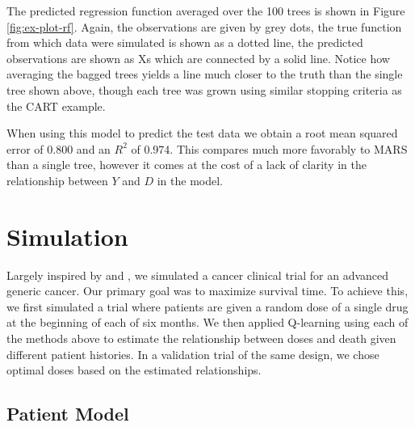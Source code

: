 \documentclass[12pt]{article}
\begin{document}
The predicted regression function averaged over the 100 trees is shown in Figure \ref{fig:ex-plot-rf}. Again, the observations are given by grey dots, the true function from which data were simulated is shown as a dotted line, the predicted observations are shown as Xs which are connected by a solid line. Notice how averaging the bagged trees yields a line much closer to the truth than the single tree shown above, though each tree was grown using similar stopping criteria as the CART example. 

When using this model to predict the test data we obtain a root mean squared error of 0.800 and an $R^2$ of 0.974. This compares much more favorably to MARS than a single tree, however it comes at the cost of a lack of clarity in the relationship between $Y$ and $D$ in the model.



\section{Simulation}

Largely inspired by \textcite{crt} and \textcite{nsclc}, we simulated a cancer clinical trial for an advanced generic cancer. Our primary goal was to maximize survival time. To achieve this, we first simulated a trial where patients are given a random dose of a single drug at the beginning of each of six months. We then applied Q-learning using each of the methods above to estimate the relationship between doses and death given different patient histories. In a validation trial of the same design, we chose optimal doses based on the estimated relationships.

\subsection{Patient Model} %
\label{sub:vpm}

%
\end{document}
